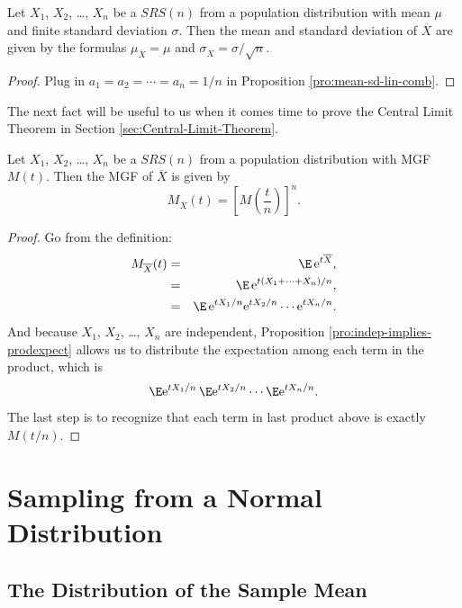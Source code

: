 \documentclass[captions=tableheading]{scrbook}
\begin{document}
\begin{prop}
\label{pro:mean-sd-xbar}
Let \(X_{1}\), \(X_{2}\), \ldots{}, \(X_{n}\) be a \(SRS(n)\) from a population distribution with mean \(\mu\) and finite standard deviation \(\sigma\). Then the mean and standard deviation of \(\overline{X}\) are given by the formulas \(\mu_{\overline{X}}=\mu\) and \(\sigma_{\overline{X}}=\sigma/\sqrt{n}\).
\end{prop}

\begin{proof}
Plug in \(a_{1}=a_{2}=\cdots=a_{n}=1/n\) in Proposition \ref{pro:mean-sd-lin-comb}.
\end{proof}

The next fact will be useful to us when it comes time to prove the Central Limit Theorem in Section \ref{sec:Central-Limit-Theorem}.

\begin{prop}
\label{pro:mgf-xbar}
Let \(X_{1}\), \(X_{2}\), \ldots{}, \(X_{n}\) be a \(SRS(n)\) from a population distribution with MGF \(M(t)\). Then the MGF of \(\overline{X}\) is given by
\begin{equation}
M_{\overline{X}}(t)=\left[M\left(\frac{t}{n}\right)\right]^{n}.
\end{equation}
\end{prop}

\begin{proof}
Go from the definition:
\begin{eqnarray*}
M_{\overline{X}}(t) & = & \E\,\mathrm{e}^{t\overline{X}},\\
 & = & \E\,\mathrm{e}^{t(X_{1}+\cdots+X_{n})/n},\\
 & = & \E\,\mathrm{e}^{tX_{1}/n}\mathrm{e}^{tX_{2}/n}\cdots\mathrm{e}^{tX_{n}/n}.
\end{eqnarray*}
And because \(X_{1}\), \(X_{2}\), \ldots{}, \(X_{n}\) are independent, Proposition \ref{pro:indep-implies-prodexpect} allows us to distribute the expectation among each term in the product, which is
\[
\E\mathrm{e}^{tX_{1}/n}\,\E\mathrm{e}^{tX_{2}/n}\cdots\E\mathrm{e}^{tX_{n}/n}.
\]
The last step is to recognize that each term in last product above is exactly \(M(t/n)\).
\end{proof}
\section{Sampling from a Normal Distribution}
\label{sec-8-2}

\label{sec:sampling-from-normal-dist}
\subsection{The Distribution of the Sample Mean}
\label{sec-8-2-1}
\end{document}
